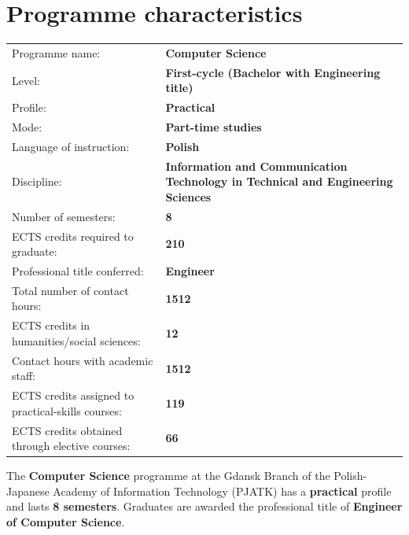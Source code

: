 \documentclass[12pt,a4paper]{article}
\renewcommand{\arraystretch}{1.35}
\begin{document}
\vspace{1cm}
\thispagestyle{empty}
\newpage
\setcounter{page}{1}

\tableofcontents
\newpage

\section{Programme characteristics}

{\renewcommand{\arraystretch}{1.4}
\begin{tabularx}{\textwidth}{@{}Xp{8.5cm}@{}}
\toprule
  {\small Programme name:} & {\small\textbf{Computer Science}} \\
  {\small Level:} & {\small\textbf{First-cycle (Bachelor with Engineering title)}} \\
  {\small Profile:} & {\small\textbf{Practical}} \\
  {\small Mode:} & {\small\textbf{Part-time studies}} \\
  {\small Language of instruction:} & {\small\textbf{Polish}} \\
  {\small Discipline:} & {\small\textbf{Information and Communication Technology in Technical and Engineering Sciences}} \\
\midrule
  {\small Number of semesters:} & {\small\textbf{8}} \\
  {\small ECTS credits required to graduate:} & {\small\textbf{210}} \\
  {\small Professional title conferred:} & {\small\textbf{Engineer}} \\
\midrule
  {\small Total number of contact hours:} & {\small\textbf{1512}} \\
  {\small ECTS credits in humanities/social sciences:} & {\small\textbf{12}} \\
  {\small Contact hours with academic staff:} & {\small\textbf{1512}} \\
  {\small ECTS credits assigned to practical-skills courses:} & {\small\textbf{119}} \\
  {\small ECTS credits obtained through elective courses:} & {\small\textbf{66}} \\
\bottomrule
\end{tabularx}}

\bigskip


\newpage

The \textbf{Computer Science} programme at the Gdansk Branch of the Polish-Japanese Academy of Information Technology (PJATK) has a \textbf{practical} profile and lasts \textbf{8 semesters}. Graduates are awarded the professional title of \textbf{Engineer of Computer Science}.
\end{document}
